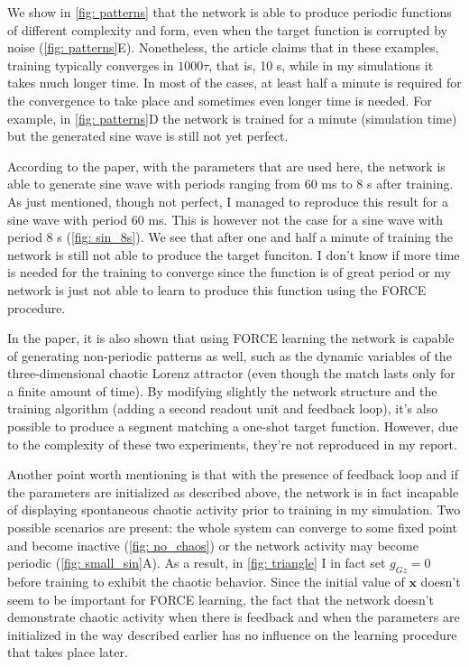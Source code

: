 We show in \autoref{fig: patterns} that the network
is able to produce periodic functions of different complexity and form, 
even when the target function is corrupted by noise 
(\autoref{fig: patterns}E). Nonetheless, the article claims that in these
examples, training typically converges in $1000\tau$, that is, 10 s, while
in my simulations it takes much longer time. In most of the cases,
at least half a minute is required for the convergence to take place and 
sometimes even longer time is needed. For example, in 
\autoref{fig: patterns}D the network is trained for a minute 
(simulation time) but the generated sine wave is still not yet perfect.

According to the paper, with the parameters that are used here,
the network is able to generate sine wave with periods ranging from 60 ms
to 8 s after training. As just mentioned, though not perfect, I managed
to reproduce this result for a sine wave with period 60 ms. This is
however not the case for a sine wave with period 8 s 
(\autoref{fig: sin_8s}). We see that after one and half a minute of training
the network is still not able to produce the target funciton.
I don't know if more time is needed for the training to converge 
since the function is of great period or my network is just not able to
learn to produce this function using the FORCE procedure.

In the paper, it is also shown that using FORCE learning the network is
capable of generating non-periodic patterns as well, such as the dynamic 
variables of the three-dimensional chaotic Lorenz attractor (even though the
match lasts only for a finite amount of time). By modifying slightly 
the network structure and the training algorithm (adding a second readout
unit and feedback loop), it's also possible to produce a segment matching
a one-shot target function. However, due to the complexity of these two
experiments, they're not reproduced in my report.

Another point worth mentioning is that with the presence of feedback loop
and if the parameters are initialized as described above, the network is in
fact incapable of displaying spontaneous chaotic activity prior
to training in my simulation.
Two possible scenarios are present: the whole system can converge
to some fixed point and become inactive (\autoref{fig: no_chaos}) or 
the network activity may become periodic (\autoref{fig: small_sin}A).
As a result, in \autoref{fig: triangle} I in fact set $g_{Gz}=0$
before training to exhibit the chaotic behavior. Since the initial value
of $\mathbf{x}$ doesn't seem to be important for FORCE learning, the fact
that the network doesn't demonstrate chaotic activity when there is 
feedback and when the parameters are initialized in the way described earlier
has no influence on the learning procedure that takes place later. 

